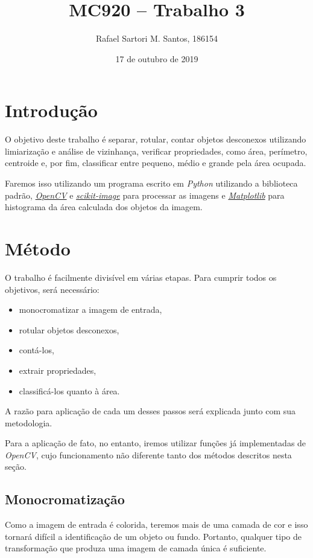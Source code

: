 \documentclass[brazilian,a4paper,twocolumn]{article}
\title{MC920 -- Trabalho 3}
\author{Rafael Sartori M. Santos, 186154}
\date{17 de outubro de 2019}
\begin{document}
\maketitle


\section{Introdução}

    O objetivo deste trabalho é separar, rotular, contar objetos desconexos utilizando limiarização e análise de vizinhança, verificar propriedades, como área, perímetro, centroide e, por fim, classificar entre pequeno, médio e grande pela área ocupada.

    Faremos isso utilizando um programa escrito em \emph{Python} utilizando a biblioteca padrão, \href{https://opencv.org/}{\emph{OpenCV}} e \href{https://scikit-image.org/}{\emph{scikit-image}} para processar as imagens e \href{https://matplotlib.org/}{\emph{Matplotlib}} para histograma da área calculada dos objetos da imagem.


\section{Método}

    O trabalho é facilmente divisível em várias etapas. Para cumprir todos os objetivos, será necessário:
    \begin{itemize}
        \item monocromatizar a imagem de entrada,
        \item rotular objetos desconexos,
        \item contá-los,
        \item extrair propriedades,
        \item classificá-los quanto à área.
    \end{itemize}

    A razão para aplicação de cada um desses passos será explicada junto com sua metodologia.

    Para a aplicação de fato, no entanto, iremos utilizar funções já implementadas de \emph{OpenCV}, cujo funcionamento não diferente tanto dos métodos descritos nesta seção.

    \subsection{Monocromatização}

        Como a imagem de entrada é colorida, teremos mais de uma camada de cor e isso tornará difícil a identificação de um objeto ou fundo. Portanto, qualquer tipo de transformação que produza uma imagem de camada única é suficiente.
\end{document}
